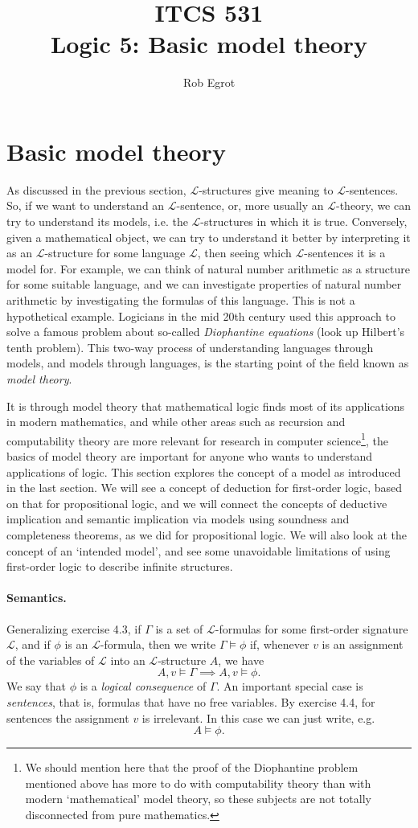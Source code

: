 \documentclass{article}
\title{ITCS 531 \\Logic 5: Basic model theory}
\author{Rob Egrot}
\date{}
\theoremstyle{plain}
\newcommand{\sL}{\mathscr{L}}
\begin{document}
\maketitle

\section{Basic model theory}
As discussed in the previous section, $\sL$-structures give meaning to $\sL$-sentences. So, if we want to understand an $\sL$-sentence, or, more usually an $\sL$-theory, we can try to understand its models, i.e. the $\sL$-structures in which it is true. Conversely, given a mathematical object, we can try to understand it better by interpreting it as an $\sL$-structure for some language $\sL$, then seeing which $\sL$-sentences it is a model for. For example, we can think of natural number arithmetic as a structure for some suitable language, and we can investigate properties of natural number arithmetic by investigating the formulas of this language. This is not a hypothetical example. Logicians in the mid 20th century used this approach to solve a famous problem about so-called \emph{Diophantine equations} (look up Hilbert's tenth problem). This two-way process of understanding languages through models, and models through languages, is the starting point of the field known as \emph{model theory}. 

It is through model theory that mathematical logic finds most of its applications in modern mathematics, and while other areas such as recursion and computability theory are more relevant for research in computer science\footnote{We should mention here that the proof of the Diophantine problem mentioned above has more to do with computability theory than with modern `mathematical' model theory, so these subjects are not totally disconnected from pure mathematics.}, the basics of model theory are important for anyone who wants to understand applications of logic. This section explores the concept of a model as introduced in the last section. We will see a concept of deduction for first-order logic, based on that for propositional logic, and we will connect the concepts of deductive implication and semantic implication via models using soundness and completeness theorems, as we did for propositional logic. We will also look at the concept of an `intended model', and see some unavoidable limitations of using first-order logic to describe infinite structures.  
  
\paragraph{Semantics.}
Generalizing exercise 4.3, if $\Gamma$ is a set of $\sL$-formulas for some first-order signature $\sL$, and if $\phi$ is an $\sL$-formula, then we write $\Gamma\models \phi$ if, whenever $v$ is an assignment of the variables of $\sL$ into an $\sL$-structure $A$, we have \[A, v \models \Gamma\implies A,v \models \phi.\] 
We say that $\phi$ is a \emph{logical consequence} of $\Gamma$. An important special case is \emph{sentences}, that is, formulas that have no free variables. By exercise 4.4, for sentences the assignment $v$ is irrelevant. In this case we can just write, e.g. \[A\models \phi.\]
\end{document}
